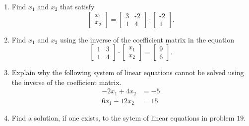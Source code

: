 \documentclass[11pt]{article} %
\begin{document}
\begin{enumerate}
\item Find $x_1$ and $x_2$ that satisfy $$\begin{bmatrix} x_1 \\ x_2 \end{bmatrix} = \begin{bmatrix} 3 & \text{-}2 \\ 1 & 4 \end{bmatrix} \cdot \begin{bmatrix} \text{-}2 \\ 1 \end{bmatrix}.$$
\item Find $x_1$ and $x_2$ using the inverse of the coefficient matrix in the equation 
$$\begin{bmatrix} 1 & 3 \\ 1 & 4 \end{bmatrix} \cdot \begin{bmatrix} x_1 \\ x_2 \end{bmatrix} =  \begin{bmatrix} 9 \\ 6 \end{bmatrix}.$$

\item Explain why the following system of linear equations cannot be solved using the inverse of the coefficient matrix. 
\begin{align*}
-2x_1 + 4x_2 &= -5 \\
6x_1 - 12x_2 &= 15
\end{align*}
\item Find a solution, if one exists, to the sytem of linear equations in problem $19.$
\end{enumerate}
\end{document}
